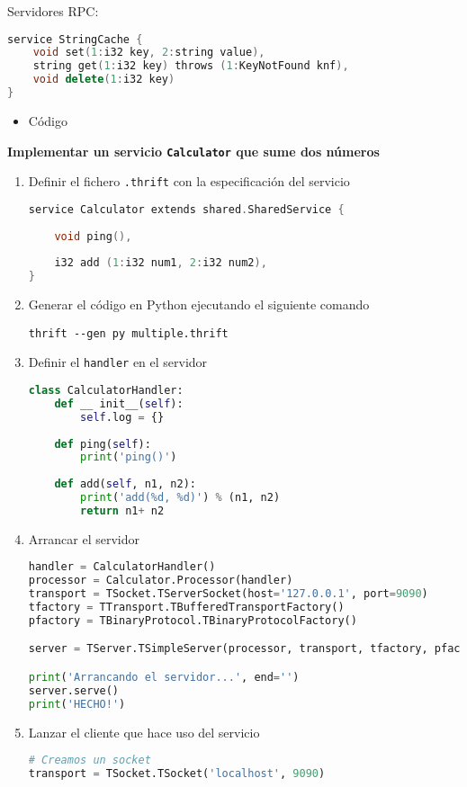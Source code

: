 Servidores RPC:
\pagebreak
\begin{lstlisting}[language=C++]
service StringCache {
	void set(1:i32 key, 2:string value),
	string get(1:i32 key) throws (1:KeyNotFound knf),
	void delete(1:i32 key)
}
\end{lstlisting}
\begin{itemize}[label=\color{red}\textbullet, leftmargin=*]
	\item \color{lightblue}Código
\end{itemize}
\textbf{Implementar un servicio \texttt{\textbf{Calculator}} que sume dos números}
\begin{enumerate}[label=\color{lightblue}\arabic*)]
	\item Definir el fichero \texttt{.thrift} con la especificación del servicio
\begin{lstlisting}[language=C++]
service Calculator extends shared.SharedService {
	
	void ping(),
	
	i32 add (1:i32 num1, 2:i32 num2),
}
\end{lstlisting}
\item Generar el código en Python ejecutando el siguiente comando
\begin{lstlisting}
thrift --gen py multiple.thrift
\end{lstlisting}
\item Definir el \texttt{handler} en el servidor
\begin{lstlisting}[language=python]
class CalculatorHandler:
	def __ init__(self):
		self.log = {}
		
	def ping(self):
		print('ping()')
		
	def add(self, n1, n2):
		print('add(%d, %d)') % (n1, n2)
		return n1+ n2
\end{lstlisting}
\item Arrancar el servidor
\begin{lstlisting}[language=python]
handler = CalculatorHandler()
processor = Calculator.Processor(handler)
transport = TSocket.TServerSocket(host='127.0.0.1', port=9090)
tfactory = TTransport.TBufferedTransportFactory()
pfactory = TBinaryProtocol.TBinaryProtocolFactory()

server = TServer.TSimpleServer(processor, transport, tfactory, pfactory)

print('Arrancando el servidor...', end='')
server.serve()
print('HECHO!')
\end{lstlisting}
\item Lanzar el cliente que hace uso del servicio
\begin{lstlisting}[language=python]
# Creamos un socket
transport = TSocket.TSocket('localhost', 9090)


\end{lstlisting}
\end{enumerate}
